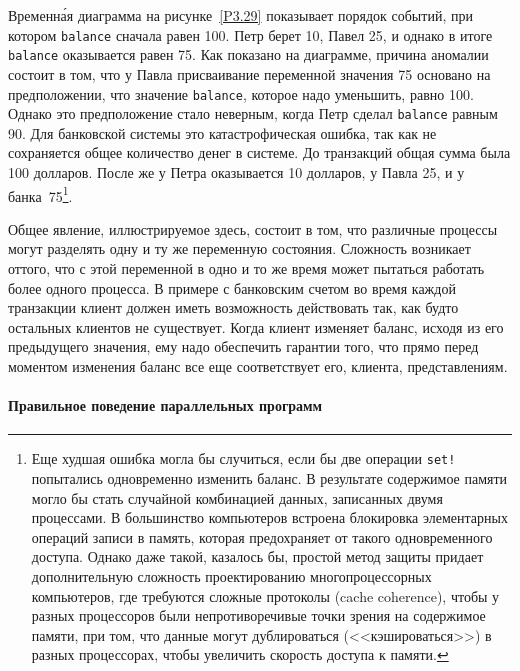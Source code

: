 Временн\'{а}я диаграмма на рисунке~\ref{P3.29}
показывает порядок событий, при котором {\tt balance} сначала
равен 100.  Петр берет 10, Павел  25, и однако в итоге
{\tt ba\-lance} оказывается равен 75.  Как показано на диаграмме,
причина аномалии состоит в том, что у Павла присваивание переменной
значения 75 основано на предположении, что значение
{\tt balance}, которое надо уменьшить, равно 100.  Однако это
предположение стало неверным, когда Петр сделал {\tt balance}
равным 90.  Для банковской системы это катастрофическая ошибка,
так как не сохраняется общее количество денег в системе.  До
транзакций общая сумма была 100 долларов.  После же у Петра оказывается 10
долларов, у Павла 25, и у банка~75\footnote{Еще худшая ошибка могла бы случиться, если бы две операции
{\tt set!} попытались одновременно изменить баланс. В
результате содержимое памяти могло бы стать случайной комбинацией
данных, записанных двумя процессами.  В большинство компьютеров встроена
блокировка элементарных операций записи в память, которая
предохраняет от такого одновременного доступа.  Однако даже такой,
казалось бы, простой метод защиты придает дополнительную сложность проектированию
многопроцессорных компьютеров, где требуются сложные протоколы
 (cache coherence), чтобы у разных процессоров были
непротиворечивые точки зрения на содержимое памяти, при том,
что данные могут дублироваться (<<кэшироваться>>) в разных процессорах,
чтобы увеличить скорость доступа к памяти.
}.

%
%
Общее явление, иллюстрируемое здесь, состоит в том, что
различные процессы могут разделять одну и ту же переменную состояния.
Сложность возникает оттого, что с этой переменной  в одно и то же
время может пытаться работать более одного процесса.  В примере с
банковским счетом во время каждой транзакции клиент должен иметь
возможность действовать так, как будто остальных клиентов не
существует.  Когда клиент изменяет баланс, исходя из
его предыдущего значения, ему надо обеспечить гарантии того,
что прямо перед моментом изменения баланс все еще
соответствует его, клиента, представлениям.

\paragraph{Правильное поведение параллельных программ}


